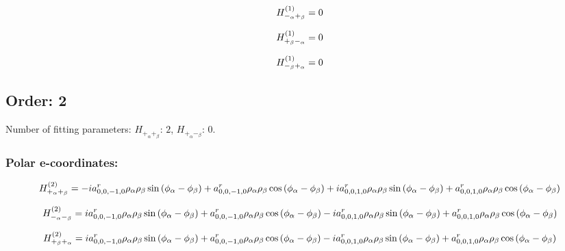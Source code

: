 \documentclass[fleqn]{article}
\begin{document}
\begin{dmath*}
H_{-_{\alpha}+_{\beta}}^{(1)}=0\\
\end{dmath*}

\begin{dmath*}
H_{+_{\beta}-_{\alpha}}^{(1)}=0\\
\end{dmath*}

\begin{dmath*}
H_{-_{\beta}+_{\alpha}}^{(1)}=0\\
\end{dmath*}
\subsection{Order: 2}
Number of fitting parameters: $H_{+_{\alpha}+_{\beta}}$: $2$, $H_{+_{\alpha}-_{\beta}}$: $0$.
\subsubsection*{Polar e-coordinates:}

\begin{dmath*}
H_{+_{\alpha}+_{\beta}}^{(2)}=-  i a^{r}_{0,0,-1,0} \rho_{\alpha} \rho_{\beta} \sin{\left (\phi_{\alpha} - \phi_{\beta} \right )} + a^{r}_{0,0,-1,0} \rho_{\alpha} \rho_{\beta} \cos{\left (\phi_{\alpha} - \phi_{\beta} \right )} +  i a^{r}_{0,0,1,0} \rho_{\alpha} \rho_{\beta} \sin{\left (\phi_{\alpha} - \phi_{\beta} \right )} + a^{r}_{0,0,1,0} \rho_{\alpha} \rho_{\beta} \cos{\left (\phi_{\alpha} - \phi_{\beta} \right )}\\
\end{dmath*}

\begin{dmath*}
H_{-_{\alpha}-_{\beta}}^{(2)}= i a^{r}_{0,0,-1,0} \rho_{\alpha} \rho_{\beta} \sin{\left (\phi_{\alpha} - \phi_{\beta} \right )} + a^{r}_{0,0,-1,0} \rho_{\alpha} \rho_{\beta} \cos{\left (\phi_{\alpha} - \phi_{\beta} \right )} -  i a^{r}_{0,0,1,0} \rho_{\alpha} \rho_{\beta} \sin{\left (\phi_{\alpha} - \phi_{\beta} \right )} + a^{r}_{0,0,1,0} \rho_{\alpha} \rho_{\beta} \cos{\left (\phi_{\alpha} - \phi_{\beta} \right )}\\
\end{dmath*}

\begin{dmath*}
H_{+_{\beta}+_{\alpha}}^{(2)}= i a^{r}_{0,0,-1,0} \rho_{\alpha} \rho_{\beta} \sin{\left (\phi_{\alpha} - \phi_{\beta} \right )} + a^{r}_{0,0,-1,0} \rho_{\alpha} \rho_{\beta} \cos{\left (\phi_{\alpha} - \phi_{\beta} \right )} -  i a^{r}_{0,0,1,0} \rho_{\alpha} \rho_{\beta} \sin{\left (\phi_{\alpha} - \phi_{\beta} \right )} + a^{r}_{0,0,1,0} \rho_{\alpha} \rho_{\beta} \cos{\left (\phi_{\alpha} - \phi_{\beta} \right )}\\
\end{dmath*}
\end{document}
